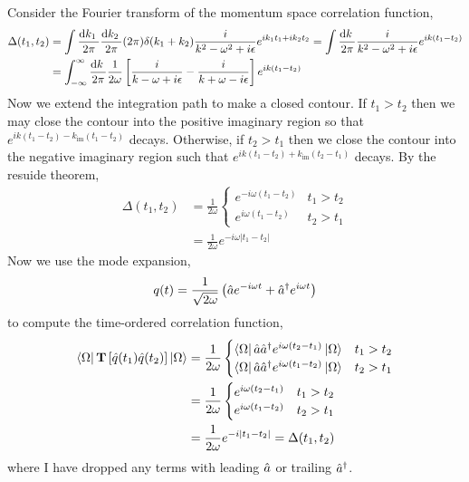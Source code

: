 \documentclass[12pt]{article}
\begin{document}
Consider the Fourier transform of the momentum space correlation function,
\begin{align*}
\Delta(t_1, t_2) & = \int \frac{\mathrm{d}k_1 \:}{2\pi} \frac{\mathrm{d}k_2 \:}{2\pi} (2 \pi) \delta(k_1 + k_2) \frac{i}{k^2 - \omega^2 + i \epsilon} e^{i k_1 t_1 + i k_2 t_2} = \int \frac{\mathrm{d}k \:}{2 \pi} \frac{i}{k^2 - \omega^2 + i \epsilon} e^{i k (t_1 - t_2)} 
\\
& =  \int_{-\infty}^\infty \frac{\mathrm{d}k \:}{2 \pi} \frac{1}{2\omega} \left[ \frac{i}{k - \omega + i \epsilon} - \frac{i}{k + \omega - i \epsilon} \right] e^{i k (t_1 - t_2)}  
\end{align*}
Now we extend the integration path to make a closed contour. If $t_1 > t_2$ then we may close the contour into the positive imaginary region so that $e^{ik(t_1 - t_2) - k_{\text{im}} (t_1 - t_2)}$ decays. Otherwise, if $t_2 > t_1$ then we close the contour into the negative imaginary region such that $e^{ik(t_1 - t_2) + k_{\text{im}} (t_2 - t_1)}$ decays. 
By the resuide theorem,
\begin{align*}
\Delta(t_1, t_2) &= \frac{1}{2 \omega}
\begin{cases}
e^{- i \omega(t_1 - t_2)} & t_1 > t_2
\\
e^{i \omega (t_1 - t_2)} & t_2 > t_1
\end{cases}
\\
& = \frac{1}{2\omega} e^{-i \omega |t_1 - t_2|}
\end{align*}
Now we use the mode expansion,
\[ q(t) = \frac{1}{\sqrt{2 \omega}} \left( \hat{a} e^{- i \omega t} + \hat{a}^\dagger e^{i \omega t} \right) \]
to compute the time-ordered correlation function,
\begin{align*}
\left< \Omega \right| \mathbf{T}\left[  \hat{q}(t_1) \hat{q}(t_2)  \right] \left| \Omega \right> & = \frac{1}{2 \omega}
\begin{cases}
\left< \Omega \right| \hat{a} \hat{a}^\dagger e^{i \omega (t_2 - t_1)} \left| \Omega \right> & t_1 > t_2
\\
\left< \Omega \right| \hat{a} \hat{a}^\dagger e^{i \omega (t_1 - t_2)} \left| \Omega \right> & t_2 > t_1
\end{cases}
\\
& = \frac{1}{2\omega}
\begin{cases}
e^{i \omega (t_2 - t_1)} & t_1 > t_2
\\
e^{i \omega (t_1 - t_2)} & t_2 > t_1
\end{cases}
\\
& = \frac{1}{2 \omega} e^{- i |t_1 - t_2|} = \Delta(t_1, t_2) 
\end{align*} 
where I have dropped any terms with leading $\hat{a}$ or trailing $\hat{a}^\dagger$. 
\end{document}
